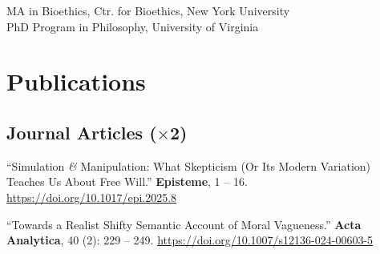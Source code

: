 \documentclass[10pt]{article}
\begin{document}
\hangindent=0.8cm \quad MA in Bioethics, Ctr. for Bioethics, New York University\hspace*{\fill}{\small New York, NY, USA\\
``A Supervaluationist Theory of Moral Vagueness'' (Thesis)\\
-- Claudia Passos Ferreira (advisor), Daniel Fogal (second reader)}\\

\hangindent=0.8cm \quad PhD Program in Philosophy, University of Virginia\hspace*{\fill}{\small Charlottesville, VA, USA}

\section*{Publications}




\subsection*{Journal Articles (\begin{math}\times\end{math}2)}

\hangindent=0.8cm ``Simulation \emph{\&} Manipulation: What Skepticism (Or Its Modern Variation) Teaches Us About Free Will.'' \textbf{Episteme}, 1 -- 16. \href{https://doi.org/10.1017/epi.2025.8}{\url{https://doi.org/10.1017/epi.2025.8}}\medskip

\hangindent=0.8cm ``Towards a Realist Shifty Semantic Account of Moral Vagueness.'' \textbf{Acta Analytica}, 40 (2): 229 -- 249. \href{https://doi.org/10.1007/s12136-024-00603-5}{\url{https://doi.org/10.1007/s12136-024-00603-5}}
\end{document}
